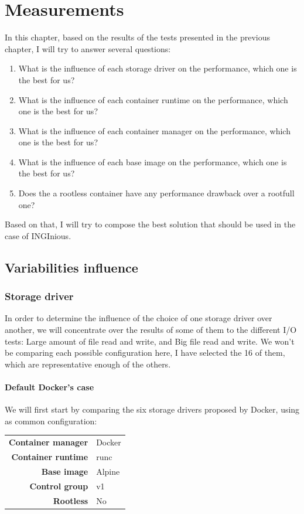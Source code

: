 \chapter{Measurements}

In this chapter, based on the results of the tests presented in the previous chapter, I will try to answer several questions:
\begin{enumerate}
  \item What is the influence of each storage driver on the performance, which one is the best for us?
  \item What is the influence of each container runtime on the performance, which one is the best for us?
  \item What is the influence of each container manager on the performance, which one is the best for us?
  \item What is the influence of each base image on the performance, which one is the best for us?
  \item Does the a rootless container have any performance drawback over a rootfull one?
\end{enumerate}

Based on that, I will try to compose the best solution that should be used in the case of INGInious.

\section{Variabilities influence}

\subsection{Storage driver}
In order to determine the influence of the choice of one storage driver over another, we will concentrate over the results of some of them to the different I/O tests: Large amount of file read and write, and Big file read and write.
We won't be comparing each possible configuration here, I have selected the 16 of them, which are representative enough of the others.  

\clearpage
\subsubsection{Default Docker's case}
We will first start by comparing the six storage drivers proposed by Docker, using as common configuration:

\begin{tabular}{rl}
   \textbf{Container manager} & Docker \\
   \textbf{Container runtime} & runc \\
   \textbf{Base image} & Alpine \\
   \textbf{Control group} & v1 \\
   \textbf{Rootless} & No 
\end{tabular}

